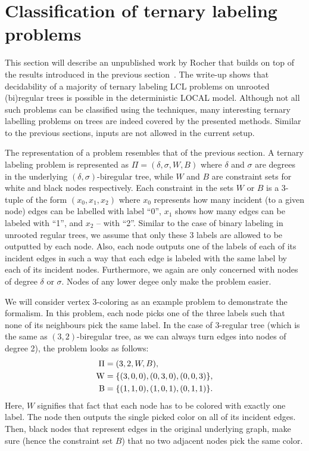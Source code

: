 \section{Classification of ternary labeling problems}

This section will describe an unpublished work by Rocher that builds on top
of the results introduced in the previous section~\cite{Rocher2020doc, Rocher2020clas}.
The write-up shows that decidability of a majority of ternary labeling LCL problems on unrooted
(bi)regular trees is possible in the deterministic LOCAL model. Although not all such problems
can be classified using the techniques, many interesting ternary labelling problems on trees
are indeed covered by the presented methods.
Similar to the previous sections, inputs are not allowed in the current setup.

The representation of a problem resembles that of the previous section. A
ternary labeling problem is represented as $\Pi = (\delta, \sigma, W, B)$
where $\delta$ and $\sigma$ are degrees in the underlying $(\delta, \sigma)$-biregular
tree, while $W$ and $B$ are constraint sets for white and black nodes respectively.
Each constraint in the sets $W$ or $B$ is a 3-tuple of the form $(x_0, x_1, x_2)$
where $x_0$ represents how many incident (to a given node) edges can be labelled with label ``0'',
$x_1$ shows how many edges can be labeled with ``1'', and $x_2$ -- with ``2''. Similar to the case
of binary labeling in unrooted regular trees, we assume that only these 3 labels are allowed to
be outputted by each node. Also, each node outputs one of the labels of each of its incident edges
in such a way that each edge is labeled with the same label by each of its incident nodes.
Furthermore, we again are only concerned with nodes of degree $\delta$ or $\sigma$. Nodes of
any lower degee only make the problem easier.

We will consider vertex 3-coloring as an example problem to demonstrate the formalism.
In this problem, each node picks one of the three labels such that none of its neighbours
pick the same label. In the case of 3-regular tree (which is the same as $(3, 2)$-biregular tree,
as we can always turn edges into nodes of degree 2), the problem looks as follows:
\begin{align*}
  \Pi &= (3, 2, W, B), \\
  \operatorname{W} &= \{ (3, 0, 0), (0, 3, 0), (0, 0, 3) \}, \\
  \operatorname{B} &= \{ (1, 1, 0), (1, 0, 1), (0, 1, 1) \}.
\end{align*}
Here, $W$ signifies that fact that each node has to be colored with exactly one label. The node then outputs
the single picked color on all of its incident edges. Then, black nodes that represent edges in the
original underlying graph, make sure (hence the constraint set $B$) that no two adjacent nodes
pick the same color.

